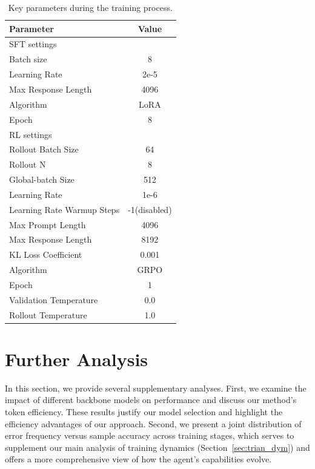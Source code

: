 \begin{table}[htbp]
\centering
\caption{Key parameters during the training process.}
\label{tab:base_settings}
\begin{tabular}{lc}
\toprule
\textbf{Parameter} & \textbf{Value} \\
\midrule
SFT settings \\
\midrule
Batch size  & 8 \\
Learning Rate & 2e-5 \\
Max Response Length & 4096 \\
Algorithm & LoRA \\
Epoch & 8 \\
\midrule
RL settings \\
\midrule
Rollout Batch Size & 64 \\
Rollout N & 8 \\
Global-batch Size & 512 \\
Learning Rate & 1e-6 \\
Learning Rate Warmup Steps & -1(disabled) \\
Max Prompt Length & 4096 \\
Max Response Length & 8192 \\
KL Loss Coefficient & 0.001 \\
Algorithm & GRPO \\
Epoch & 1\\
Validation Temperature & 0.0 \\
Rollout Temperature & 1.0 \\
\bottomrule
\end{tabular}
\end{table}
\section{Further Analysis}
In this section, we provide several supplementary analyses. First, we examine the impact of different backbone models on performance and discuss our method's token efficiency. These results justify our model selection and highlight the efficiency advantages of our approach. Second, we present a joint distribution of error frequency versus sample accuracy across training stages, which serves to supplement our main analysis of training dynamics (Section~\ref{sec:trian_dym}) and offers a more comprehensive view of how the agent's capabilities evolve.
